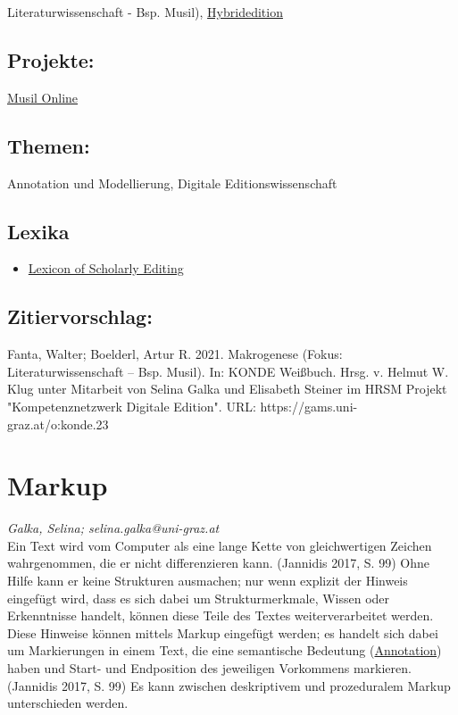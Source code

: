 \documentclass{article}
\begin{document}
{                           Literaturwissenschaft - Bsp. Musil)}, \href{https://gams.uni-graz.at/o:konde.96}{Hybridedition}\subsection*{Projekte:}\href{http://musilonline.at}{Musil Online}\subsection*{Themen:}Annotation und Modellierung, Digitale Editionswissenschaft\subsection*{Lexika}\begin{itemize}\item \href{https://lexiconse.uantwerpen.be/index.php/lexicon/macrogenesis/}{Lexicon of Scholarly Editing}\end{itemize}\subsection*{Zitiervorschlag:}Fanta, Walter; Boelderl, Artur R. 2021. Makrogenese (Fokus: Literaturwissenschaft – Bsp. Musil). In: KONDE Weißbuch. Hrsg. v. Helmut W. Klug unter Mitarbeit von Selina Galka und Elisabeth Steiner im HRSM Projekt "Kompetenznetzwerk Digitale Edition". URL: https://gams.uni-graz.at/o:konde.23\newpage\section*{Markup} \emph{Galka, Selina; selina.galka@uni-graz.at }\\
        
    Ein Text wird vom Computer als eine lange Kette von gleichwertigen Zeichen
                  wahrgenommen, die er nicht differenzieren kann. (Jannidis 2017, S.
                     99) Ohne Hilfe kann er keine Strukturen ausmachen; nur wenn explizit der
                  Hinweis eingefügt wird, dass es sich dabei um Strukturmerkmale, Wissen oder
                  Erkenntnisse handelt, können diese Teile des Textes weiterverarbeitet werden.
                  Diese Hinweise können mittels Markup eingefügt werden; es handelt sich dabei um
                  Markierungen in einem Text, die eine semantische Bedeutung (\href{http://gams.uni-graz.at/o:konde.17}{Annotation}) haben und Start- und Endposition des
                  jeweiligen Vorkommens markieren. (Jannidis 2017, S. 99) Es kann
                  zwischen deskriptivem und prozeduralem Markup unterschieden werden. \\
            
\end{document}
